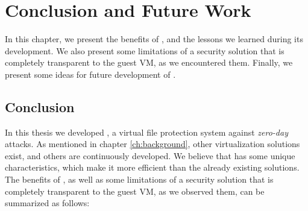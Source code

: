 
\chapter{Conclusion and Future Work}\label{ch:chapter5}

\par In this chapter, we present the benefits of , and the lessons we learned during its development. We also present some limitations of a security solution that is completely transparent to the guest \ac{VM}, as we encountered them. Finally, we present some ideas for future development of .

\section{Conclusion}

\par In this thesis we developed , a virtual file protection system against \emph{zero-day} attacks. As mentioned in chapter \ref{ch:background}, other virtualization solutions exist, and others are continuously developed. We believe that  has some unique characteristics, which make it more efficient than the already existing solutions. The benefits of , as well as some limitations of a security solution that is completely transparent to the guest \ac{VM}, as we observed them, can be summarized as follows:

